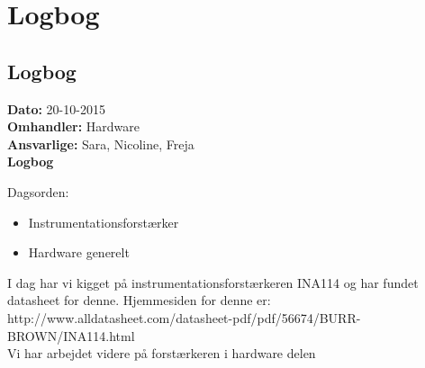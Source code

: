 \chapter{Logbog}
\section{Logbog}

\textbf{Dato:} 20-10-2015 \\
\textbf{Omhandler:} Hardware \\
\textbf{Ansvarlige:} Sara, Nicoline, Freja \\
\textbf{Logbog}

Dagsorden:
\begin{itemize}
	\item Instrumentationsforstærker
	\item Hardware generelt
\end{itemize}

I dag har vi kigget på instrumentationsforstærkeren INA114 og har fundet datasheet for denne. Hjemmesiden for denne er: http://www.alldatasheet.com/datasheet-pdf/pdf/56674/BURR-BROWN/INA114.html\\
Vi har arbejdet videre på forstærkeren i hardware delen\\
